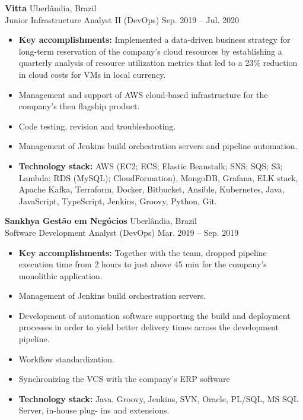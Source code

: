 \documentclass[12pt]{article}
\newcommand{\entry}[4]{{{\textbf{#1}}} \hfill #3 \\ #2 \hfill #4}
\begin{document}
\begin{paracol}{2}
\medskip

\entry{Vitta}{Junior Infrastructure Analyst II (DevOps)}{Uberlândia, Brazil}{Sep. 2019 -- Jul. 2020}
\begin{itemize}[noitemsep,leftmargin=3.5mm,rightmargin=0mm,topsep=6pt]
  \item \textbf{Key accomplishments:} Implemented a data-driven business strategy for long-term reservation of the company's cloud resources by establishing a quarterly analysis of resource utilization metrics that led to a 23\% reduction in cloud costs for VMs in local currency.
  \item Management and support of AWS cloud-based infrastructure for the company’s then flagship product.
  \item Code testing, revision and troubleshooting.
  \item Management of Jenkins build orchestration servers and pipeline automation.
  \item \textbf{Technology stack:} AWS (EC2; ECS; Elastic Beanstalk; SNS; SQS; S3;
  Lambda; RDS (MySQL); CloudFormation), MongoDB, Grafana, ELK stack, Apache Kafka,
  Terraform, Docker, Bitbucket, Ansible, Kubernetes, Java, JavaScript, TypeScript,
  Jenkins, Groovy, Python, Git.
\end{itemize}

\medskip

\entry{Sankhya Gestão em Negócios}{Software Development Analyst (DevOps)}{Uberlândia, Brazil}{Mar. 2019 -- Sep. 2019}
\begin{itemize}[noitemsep,leftmargin=3.5mm,rightmargin=0mm,topsep=6pt]
  \item \textbf{Key accomplishments:} Together with the team, dropped pipeline execution time from 2 hours to just above 45 min for the company's monolithic application.
  \item Management of Jenkins build orchestration servers.
  \item Development of automation software supporting the build and
  deployment processes in order to yield better delivery times across
  the development pipeline.
  \item Workflow standardization.
  \item Synchronizing the VCS with the company’s ERP software
  \item \textbf{Technology stack:} Java, Groovy, Jenkins, SVN, Oracle, PL/SQL, MS SQL Server, in-house plug-
  ins and extensions.
\end{itemize}

\medskip


\end{paracol}
\end{document}

